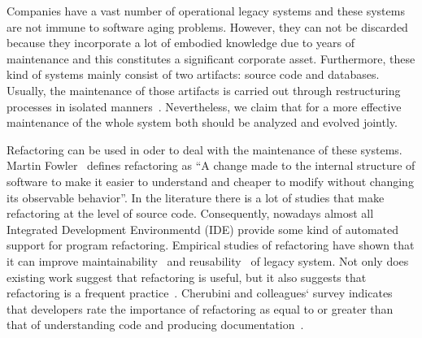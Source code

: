 Companies have a vast number of operational legacy systems and these systems are not immune to software aging problems. However, they can not be discarded because they incorporate a lot of embodied knowledge due to years of maintenance and this constitutes a significant corporate asset. Furthermore, these kind of systems mainly consist of two artifacts: source code and databases. Usually, the maintenance of those artifacts is carried out through restructuring processes in isolated manners~\cite{Moser:2006}. Nevertheless, we claim that for a more effective maintenance of the whole system both should be analyzed and evolved jointly. 

Refactoring can be used in oder to deal with the maintenance of these systems. Martin Fowler~\cite{refactImpro} defines refactoring as ``A change made to the internal structure of software to make it easier to understand and cheaper to modify without changing its observable behavior''. In the literature there is a lot of studies that make refactoring at the level of source code. Consequently, nowadays almost all Integrated Development Environmentd (IDE) provide some kind of automated support for program refactoring. Empirical studies of refactoring have shown that it can improve maintainability~\cite{1510132} and reusability~\cite{Moser:2006} of legacy system. Not only does existing work suggest that refactoring is useful, but it also suggests that refactoring is a frequent practice~\cite{Murphy:2011}. Cherubini and colleagues` survey indicates that developers rate the importance of refactoring as equal to or greater than that of understanding code and producing documentation~\cite{Cherubini:2007}.

